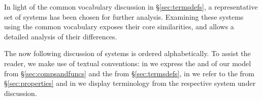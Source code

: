 \documentclass{sig-alternate}
\begin{document}
In light of the common vocabulary discussion in \S\ref{sec:termsdefs}, a
representative set of \pilot systems has been chosen for further analysis.
Examining these \pilot systems using the common vocabulary exposes their core
similarities, and allows a detailed analysis of their differences.

The now following discussion of \pilot systems is ordered alphabetically.
To assist the reader, we make use of textual conventions: in  we
express the  and  of our model
from \S\ref{sec:compsandfuncs} and the  from
\S\ref{sec:termsdefs}, in  we refer to the  from
\S\ref{sec:properties} and in  we display terminology from
the respective \pilot system under discussion.

\end{document}

